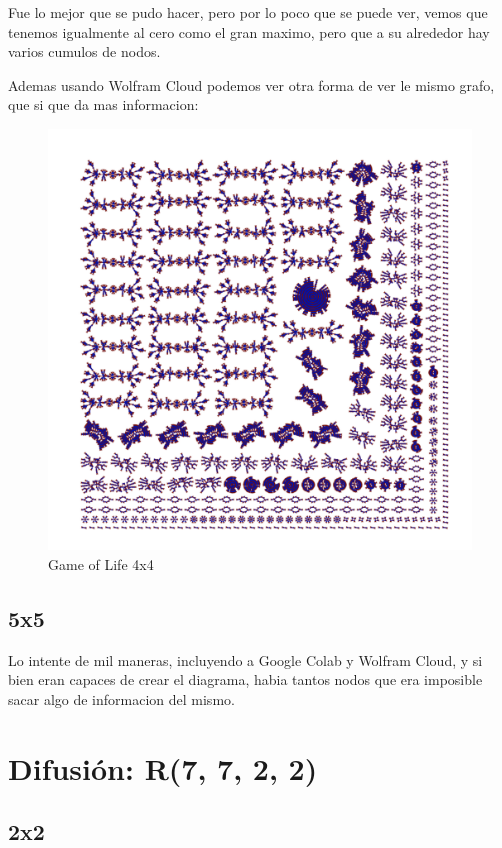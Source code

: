 \documentclass[12pt, fleqn]{report}                             %
\theoremstyle{break}                                            %
\begin{document}
       Fue lo mejor que se pudo hacer, pero por lo poco que se puede ver, vemos que tenemos igualmente al cero como el
       gran maximo, pero que a su alrededor hay varios cumulos de nodos.

       Ademas usando Wolfram Cloud podemos ver otra forma de ver le mismo grafo, que si que da mas informacion:
        \begin{figure}[ht!]
          \centering
          \includegraphics[height=\textwidth]{life4x4.png}
          \caption{Game of Life 4x4}
        \end{figure}

       \clearpage
       \section{5x5}

        Lo intente de mil maneras, incluyendo a Google Colab y Wolfram Cloud, y si bien eran capaces de crear
        el diagrama, habia tantos nodos que era imposible sacar algo de informacion del mismo.

      \clearpage
    \chapter{Difusión: R(7, 7, 2, 2)}

        \section{2x2}
\end{document}
